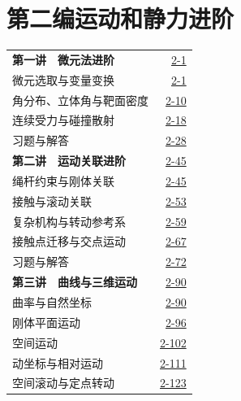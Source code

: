 \section*{第二编\quad 运动和静力进阶}
\begin{longtable}{@{}p{}r@{}}
\textbf{第一讲　微元法进阶}&\href{course-page:2:3}{2-1}\\[2pt]
\hspace{1em}微元选取与变量变换&\href{course-page:2:3}{2-1}\\[2pt]
\hspace{1em}角分布、立体角与靶面密度&\href{course-page:2:12}{2-10}\\[2pt]
\hspace{1em}连续受力与碰撞散射&\href{course-page:2:20}{2-18}\\[2pt]
\hspace{1em}习题与解答&\href{course-page:2:30}{2-28}\\[2pt]
\textbf{第二讲　运动关联进阶}&\href{course-page:2:47}{2-45}\\[2pt]
\hspace{1em}绳杆约束与刚体关联&\href{course-page:2:47}{2-45}\\[2pt]
\hspace{1em}接触与滚动关联&\href{course-page:2:55}{2-53}\\[2pt]
\hspace{1em}复杂机构与转动参考系&\href{course-page:2:61}{2-59}\\[2pt]
\hspace{1em}接触点迁移与交点运动&\href{course-page:2:69}{2-67}\\[2pt]
\hspace{1em}习题与解答&\href{course-page:2:74}{2-72}\\[2pt]
\textbf{第三讲　曲线与三维运动}&\href{course-page:2:92}{2-90}\\[2pt]
\hspace{1em}曲率与自然坐标&\href{course-page:2:92}{2-90}\\[2pt]
\hspace{1em}刚体平面运动&\href{course-page:2:98}{2-96}\\[2pt]
\hspace{1em}空间运动&\href{course-page:2:104}{2-102}\\[2pt]
\hspace{1em}动坐标与相对运动&\href{course-page:2:113}{2-111}\\[2pt]
\hspace{1em}空间滚动与定点转动&\href{course-page:2:125}{2-123}\\[2pt]

\end{longtable}
